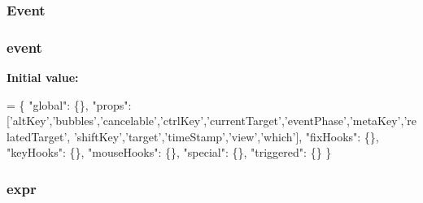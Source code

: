 \hypertarget{jquery-1_810_82-vsdoc_8js_a2cc2bb482e56b47f47b4ee54d670a418}{
\subsubsection[{Event}]{ Event}}\label{jquery-1_810_82-vsdoc_8js_a2cc2bb482e56b47f47b4ee54d670a418}
\hypertarget{jquery-1_810_82-vsdoc_8js_a2ece9eec3df1cd48d8203e336e83563e}{
\subsubsection[{event}]{ event}}\label{jquery-1_810_82-vsdoc_8js_a2ece9eec3df1cd48d8203e336e83563e}
{\bfseries Initial value\-:}
\begin{DoxyCode}
= \{ \textcolor{stringliteral}{"global"}: \{\},
\textcolor{stringliteral}{"props"}: [\textcolor{stringliteral}{'altKey'},\textcolor{stringliteral}{'bubbles'},\textcolor{stringliteral}{'cancelable'},\textcolor{stringliteral}{'ctrlKey'},\textcolor{stringliteral}{'currentTarget'},\textcolor{stringliteral}{'eventPhase'},\textcolor{stringliteral}{'metaKey'},\textcolor{stringliteral}{'relatedTarget'},\textcolor{stringliteral}{
      'shiftKey'},\textcolor{stringliteral}{'target'},\textcolor{stringliteral}{'timeStamp'},\textcolor{stringliteral}{'view'},\textcolor{stringliteral}{'which'}],
\textcolor{stringliteral}{"fixHooks"}: \{\},
\textcolor{stringliteral}{"keyHooks"}: \{\},
\textcolor{stringliteral}{"mouseHooks"}: \{\},
\textcolor{stringliteral}{"special"}: \{\},
\textcolor{stringliteral}{"triggered"}: \{\} \}
\end{DoxyCode}
\hypertarget{jquery-1_810_82-vsdoc_8js_aaacd1d5b3593ba4dfff6d67d4f6cfda1}{
\subsubsection[{expr}]{ expr}}\label{jquery-1_810_82-vsdoc_8js_aaacd1d5b3593ba4dfff6d67d4f6cfda1}
